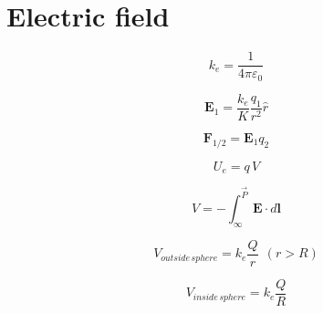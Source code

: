 \documentclass{form}
\begin{document}
\begin{minipage}[c]{0.25\textwidth}
	\section*{Electric field}
\end{minipage}
\begin{minipage}[c]{0.15\textwidth}
	\begin{equation*}
		k_e = \frac{1}{4\pi\varepsilon_0}
	\end{equation*}
\end{minipage}
\begin{minipage}[c]{0.15\textwidth}
	\begin{equation*}
		\mathbf{E}_1 = \frac{k_e}{K}\frac{q_1}{r^2}\hat{r}
	\end{equation*}
\end{minipage}
\begin{minipage}[c]{0.15\textwidth}
	\begin{equation*}
		\mathbf{F}_{1/2} = \mathbf{E}_1 q_2
	\end{equation*}
\end{minipage}
\begin{center}
\begin{minipage}[c]{0.10\textwidth}
	\begin{equation*}
		U_e=q\,V
	\end{equation*}
\end{minipage}
\begin{minipage}[c]{0.15\textwidth}
	\begin{equation*}
		V=-\int_{\infty}^{\vec{P}}{\mathbf{E}\cdot d\mathbf{l}}
	\end{equation*}
\end{minipage}
\begin{minipage}[c]{0.25\textwidth}
	\begin{equation*}
		V_{outside\,sphere} = k_e \frac{Q}{r}~~(r>R)
	\end{equation*}
\end{minipage}
\begin{minipage}[c]{0.20\textwidth}
	\begin{equation*}
		V_{inside\,sphere} = k_e \frac{Q}{R}
	\end{equation*}
\end{minipage}
\end{center}
\end{document}
